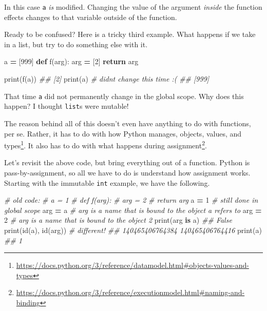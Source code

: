 \documentclass[
  12pt,
  krantz2]{krantz}
\makeatletter
\newenvironment{Shaded}{\begin{snugshade}}{\end{snugshade}}
\newcommand{\BuiltInTok}[1]{#1}
\newcommand{\CommentTok}[1]{\textcolor[rgb]{0.37,0.37,0.37}{\textit{#1}}}
\newcommand{\ControlFlowTok}[1]{\textcolor[rgb]{0.27,0.27,0.27}{\textbf{#1}}}
\newcommand{\DecValTok}[1]{\textcolor[rgb]{0.06,0.06,0.06}{#1}}
\newcommand{\KeywordTok}[1]{\textcolor[rgb]{0.27,0.27,0.27}{\textbf{#1}}}
\newcommand{\NormalTok}[1]{#1}
\newcommand{\OperatorTok}[1]{\textcolor[rgb]{0.43,0.43,0.43}{\textbf{#1}}}
\renewcommand{\href}[2]{#2\footnote{\url{#1}}}
\newenvironment{kframe}{%
\medskip{}
\setlength{\fboxsep}{.8em}
 \def\at@end@of@kframe{}%
 \ifinner\ifhmode%
  \def\at@end@of@kframe{\end{minipage}}%
  \begin{minipage}{\columnwidth}%
 \fi\fi%
 \def\FrameCommand##1{\hskip\@totalleftmargin \hskip-\fboxsep
 \colorbox{shadecolor}{##1}\hskip-\fboxsep
     \hskip-\linewidth \hskip-\@totalleftmargin \hskip\columnwidth}%
 \MakeFramed {\advance\hsize-\width
   \@totalleftmargin\z@ \linewidth\hsize
   \@setminipage}}%
 {\par\unskip\endMakeFramed%
 \at@end@of@kframe}
\renewenvironment{Shaded}{\begin{kframe}}{\end{kframe}}
\makeatother
\begin{document}
In this case \texttt{a} \emph{is} modified. Changing the value of the argument \emph{inside} the function effects changes to that variable outside of the function.

Ready to be confused? Here is a tricky third example. What happens if we take in a list, but try to do something else with it.

\begin{Shaded}
\begin{Highlighting}[]
\NormalTok{a }\OperatorTok{=}\NormalTok{ [}\DecValTok{999}\NormalTok{]}
\KeywordTok{def}\NormalTok{ f(arg):}
\NormalTok{    arg }\OperatorTok{=}\NormalTok{ [}\DecValTok{2}\NormalTok{]}
    \ControlFlowTok{return}\NormalTok{ arg}

\BuiltInTok{print}\NormalTok{(f(a))}
\CommentTok{\#\# [2]}
\BuiltInTok{print}\NormalTok{(a) }\CommentTok{\# didn\textquotesingle{}t change this time :(}
\CommentTok{\#\# [999]}
\end{Highlighting}
\end{Shaded}

That time \texttt{a} did not permanently change in the global scope. Why does this happen? I thought \texttt{list}s were mutable!

The reason behind all of this doesn't even have anything to do with functions, per se. Rather, it has to do with how Python manages, \href{https://docs.python.org/3/reference/datamodel.html\#objects-values-and-types}{objects, values, and types}. It also has to do with what happens during \href{https://docs.python.org/3/reference/executionmodel.html\#naming-and-binding}{assignment}.

Let's revisit the above code, but bring everything out of a function. Python is pass-by-assignment, so all we have to do is understand how assignment works. Starting with the immutable \texttt{int} example, we have the following.

\begin{Shaded}
\begin{Highlighting}[]
\CommentTok{\# old code: }
\CommentTok{\# a = 1}
\CommentTok{\# def f(arg):}
\CommentTok{\#     arg = 2}
\CommentTok{\#     return arg}
\NormalTok{a }\OperatorTok{=} \DecValTok{1}    \CommentTok{\# still done in global scope}
\NormalTok{arg }\OperatorTok{=}\NormalTok{ a  }\CommentTok{\# arg is a name that is bound to the object a refers to}
\NormalTok{arg }\OperatorTok{=} \DecValTok{2}  \CommentTok{\# arg is a name that is bound to the object 2}
\BuiltInTok{print}\NormalTok{(arg }\KeywordTok{is}\NormalTok{ a)}
\CommentTok{\#\# False}
\BuiltInTok{print}\NormalTok{(}\BuiltInTok{id}\NormalTok{(a), }\BuiltInTok{id}\NormalTok{(arg)) }\CommentTok{\# different!\textasciigrave{}}
\CommentTok{\#\# 140465406764384 140465406764416}
\BuiltInTok{print}\NormalTok{(a)}
\CommentTok{\#\# 1}
\end{Highlighting}
\end{Shaded}
\end{document}
